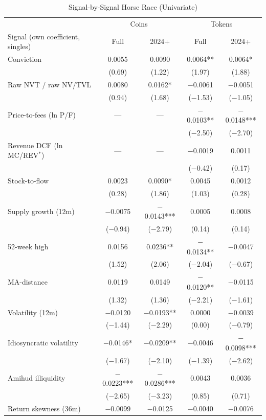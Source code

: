\documentclass[12pt]{article}
\begin{document}
\begin{table}[ht]
\centering
\caption{Signal-by-Signal Horse Race (Univariate)}
\label{tab:singles_appendix}
\footnotesize
\setlength{\tabcolsep}{4pt}
\renewcommand{\arraystretch}{0.92}
\begin{tabular}{lcccc}
\toprule
 & \multicolumn{2}{c}{Coins} & \multicolumn{2}{c}{Tokens} \\
Signal (own coefficient, singles) & Full & 2024+ & Full & 2024+ \\
\midrule
Conviction & 0.0055 & 0.0090 & 0.0064** & 0.0064* \\
 & (0.69) & (1.22) & (1.97) & (1.88) \\
Raw NVT / raw NV/TVL & 0.0080 & 0.0162* & $-$0.0061 & $-$0.0051 \\
 & (0.94) & (1.68) & ($-$1.53) & ($-$1.05) \\
Price-to-fees (ln P/F) & --- & --- & $-$0.0103** & $-$0.0148*** \\
 & & & ($-$2.50) & ($-$2.70) \\
Revenue DCF (ln MC/REV$^*$) & --- & --- & $-$0.0019 & 0.0011 \\
 & & & ($-$0.42) & (0.17) \\
Stock-to-flow & 0.0023 & 0.0090* & 0.0045 & 0.0012 \\
 & (0.28) & (1.86) & (1.03) & (0.28) \\
Supply growth (12m) & $-$0.0075 & $-$0.0143*** & 0.0005 & 0.0008 \\
 & ($-$0.94) & ($-$2.79) & (0.14) & (0.14) \\
52-week high & 0.0156 & 0.0236** & $-$0.0134** & $-$0.0047 \\
 & (1.52) & (2.06) & ($-$2.04) & ($-$0.67) \\
MA-distance & 0.0119 & 0.0149 & $-$0.0120** & $-$0.0115 \\
 & (1.32) & (1.36) & ($-$2.21) & ($-$1.61) \\
Volatility (12m) & $-$0.0120 & $-$0.0193** & 0.0000 & $-$0.0039 \\
 & ($-$1.44) & ($-$2.29) & (0.00) & ($-$0.79) \\
Idiosyncratic volatility & $-$0.0146* & $-$0.0209** & $-$0.0046 & $-$0.0098*** \\
 & ($-$1.67) & ($-$2.10) & ($-$1.39) & ($-$2.62) \\
Amihud illiquidity & $-$0.0223*** & $-$0.0286*** & 0.0043 & 0.0036 \\
 & ($-$2.65) & ($-$3.23) & (0.85) & (0.71) \\
Return skewness (36m) & $-$0.0099 & $-$0.0125 & $-$0.0040 & $-$0.0076 \\

\end{tabular}
\end{table}
\end{document}
